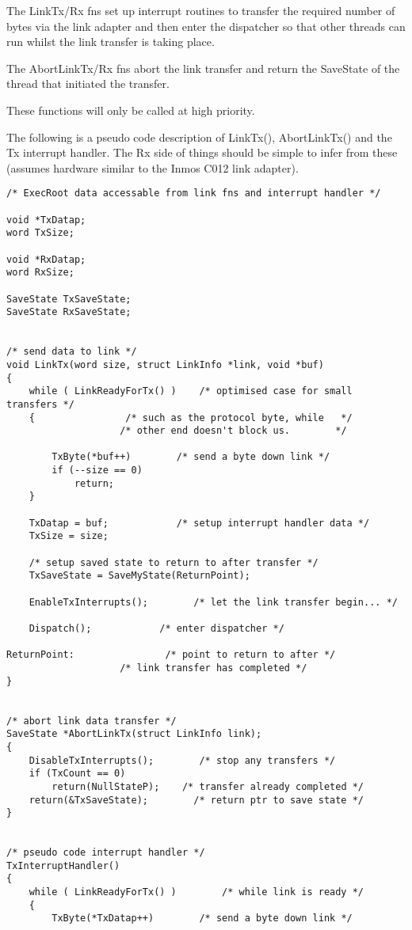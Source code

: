 The LinkTx/Rx fns set up interrupt routines to transfer the required number
of bytes via the link adapter and then enter the dispatcher so that other
threads can run whilst the link transfer is taking place.

The AbortLinkTx/Rx fns abort the link transfer and return the SaveState
of the thread that initiated the transfer.

These functions will only be called at high priority.

The following is a pseudo code description of LinkTx(), AbortLinkTx() and
the Tx interrupt handler. The Rx side of things should be simple to infer
from these (assumes hardware similar to the Inmos C012 link adapter).

\scriptsize
\begin{verbatim}
/* ExecRoot data accessable from link fns and interrupt handler */

void *TxDatap;
word TxSize;

void *RxDatap;
word RxSize;

SaveState TxSaveState;
SaveState RxSaveState;


/* send data to link */
void LinkTx(word size, struct LinkInfo *link, void *buf)
{
    while ( LinkReadyForTx() )    /* optimised case for small transfers */
    {                /* such as the protocol byte, while   */
                    /* other end doesn't block us.        */

        TxByte(*buf++)        /* send a byte down link */
        if (--size == 0)
            return;
    }

    TxDatap = buf;            /* setup interrupt handler data */
    TxSize = size;

    /* setup saved state to return to after transfer */
    TxSaveState = SaveMyState(ReturnPoint);

    EnableTxInterrupts();        /* let the link transfer begin... */

    Dispatch();            /* enter dispatcher */

ReturnPoint:                /* point to return to after */
                    /* link transfer has completed */
}


/* abort link data transfer */
SaveState *AbortLinkTx(struct LinkInfo link);
{
    DisableTxInterrupts();        /* stop any transfers */
    if (TxCount == 0)
        return(NullStateP);    /* transfer already completed */
    return(&TxSaveState);        /* return ptr to save state */
}


/* pseudo code interrupt handler */
TxInterruptHandler()
{
    while ( LinkReadyForTx() )        /* while link is ready */
    {
        TxByte(*TxDatap++)        /* send a byte down link */


\end{verbatim}
